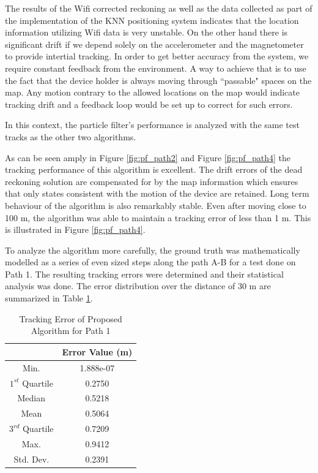 The results of the Wifi corrected reckoning as well as the data collected 
as part of the implementation of the KNN positioning system indicates that 
the location information utilizing Wifi data is very unstable. On the other
hand there is significant drift if we depend solely on the accelerometer
and the magnetometer to provide intertial tracking. In order to get 
better accuracy from the system, we require constant feedback from the 
environment. A way to achieve that is to use the fact that the device 
holder is always moving through ``passable" spaces on the map. Any motion
contrary to the allowed locations on the map would indicate tracking drift 
and a feedback loop would be set up to correct for such errors.

In this context, the particle filter's performance is analyzed with the
same test tracks as the other two algorithms. 

As can be seen amply in Figure \ref{fig:pf_path2} and Figure \ref{fig:pf_path4}
the tracking performance of this algorithm is excellent. The drift errors of the 
dead reckoning solution are compensated for by the map information
which ensures that only states consistent with the motion of the device 
are retained. Long term behaviour of the algorithm is also remarkably 
stable. Even after moving close to 100 m, the algorithm was able to 
maintain a tracking error of less than 1 m. This is illustrated in 
Figure \ref{fig:pf_path4}.

To analyze the algorithm more carefully, the ground truth was 
mathematically modelled as a series of even sized steps along the path A-B
for a test done on Path 1. The resulting tracking errors were determined 
and their statistical analysis was done. The error distribution over the 
distance of 30 m are summarized in Table \ref{tbl:tracking_error}.

\begin{table}
\centering
\begin{tabular}{c c}
\hline
\hline
& Error Value (m)\\
\hline
 Min.    & 1.888e-07\\
 $1^{st}$ Quartile & 0.2750\\  
 Median  & 0.5218\\  
 Mean    & 0.5064\\  
 $3^{rd}$ Quartile & 0.7209\\  
 Max.    & 0.9412\\  
 Std. Dev.  & 0.2391\\
\hline
\end{tabular}
\caption{Tracking Error of Proposed Algorithm for Path 1\label{tbl:tracking_error}}
\end{table}


